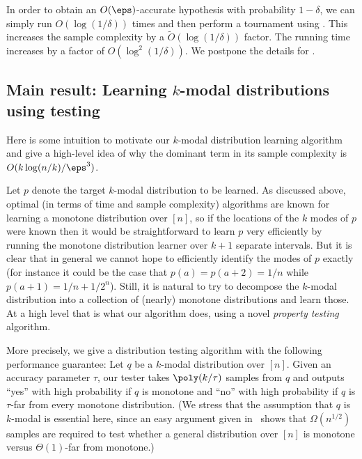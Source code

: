 %
%
%
In order to obtain
%
an $O(\eps)$-accurate hypothesis with probability $1-\delta$, we
can simply run \hyperref[alg:learn-kmodal-simple]{} $O(\log(1/\delta))$ times
and then perform a tournament using .
This increases the sample complexity by a $\tilde{O}(\log(1/\delta))$ factor.
The running time increases by a factor of $O(\log^2(1/\delta))$.
We postpone the details for .



\subsection{Main result: Learning \texorpdfstring{$k$-modal}{k-modal} distributions using testing} \label{ssec:kmodal-learn}

Here is some intuition to motivate our $k$-modal distribution learning algorithm
and give a high-level idea of why the dominant term in its sample complexity is
$O(k\log(n/k)/\eps^3)$.

Let $p$ denote the target $k$-modal distribution to be learned.
As discussed above, optimal (in terms of time and sample complexity) algorithms are known
for learning a monotone distribution over $[n]$, so if the locations of the
$k$ modes of $p$ were known then it would be straightforward to learn $p$ very efficiently
by running the monotone distribution learner over $k+1$ separate intervals.  But it is clear that
in general we cannot hope to efficiently identify the modes of $p$ exactly (for instance it could
be the case that $p(a)=p(a+2)=1/n$ while $p(a+1) = 1/n + 1/2^n$).  Still, it is natural to try to
decompose the $k$-modal distribution into a collection of (nearly) monotone  distributions
and learn those.  At a high level that is what our algorithm does, using a novel \emph{property testing}
algorithm.

%

More precisely, we give a distribution testing algorithm with the following performance guarantee:
Let $q$ be a $k$-modal distribution over $[n]$.  Given an accuracy parameter $\tau$, our tester takes $\poly(k/\tau)$ samples from $q$ and outputs ``yes''
with high probability if $q$ is {monotone} and ``no'' with high probability
if $q$ is $\tau$-far from every monotone distribution.
(We stress that the assumption that $q$ is $k$-modal is essential here, since
an easy argument given in~\cite{BKR:04long} shows that $\Omega(n^{1/2})$ samples are required to test
whether a general distribution over $[n]$ is monotone versus $\Theta(1)$-far from monotone.)

